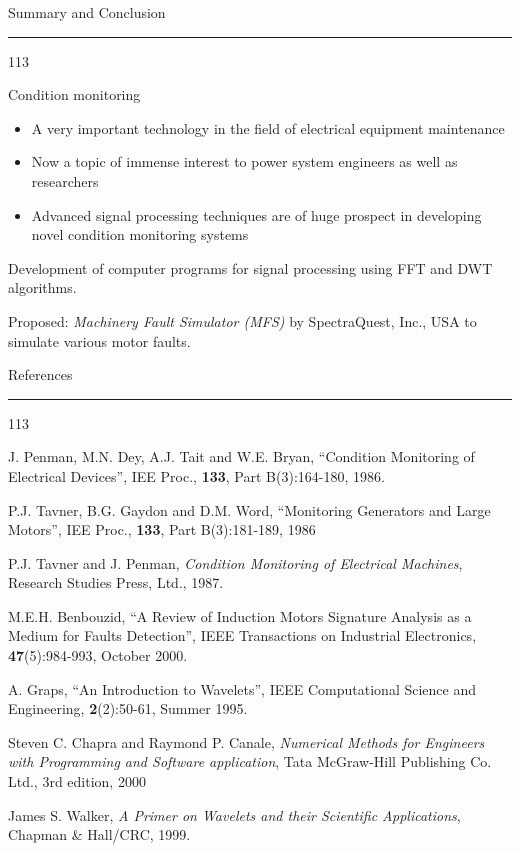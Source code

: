 \documentclass[10pt]{beamer}
\begin{document}
\begin{slide*}
{\large \textsf{Summary and Conclusion}}\\
\hrule
\vspace{10pt}
\begin{dinglist} {113}
\item Condition monitoring
\begin{itemize}
\item A very important technology in the field of electrical equipment maintenance
\item Now a topic of immense interest to power system engineers as well as researchers

\item Advanced signal processing techniques are of huge prospect in developing novel condition monitoring systems
\end{itemize} 

\item Development of computer programs for signal processing using FFT and DWT algorithms.

\item Proposed: \emph{Machinery Fault Simulator (MFS)} by SpectraQuest, Inc., USA to simulate various motor faults.
\end{dinglist} 
\end{slide*}

\begin{slide*}
{\large \textsf{References}}\\
\hrule
\vspace{10pt}
\begin{dinglist} {113}
    \item J. Penman, M.N. Dey, A.J. Tait and W.E. Bryan, ``Condition Monitoring of Electrical Devices'', IEE Proc., \textbf{133}, Part B(3):164-180, 1986.
    \item P.J. Tavner, B.G. Gaydon and D.M. Word, ``Monitoring Generators and Large Motors'', IEE Proc., \textbf{133}, Part B(3):181-189, 1986
    \item P.J. Tavner and J. Penman, \emph{Condition Monitoring of Electrical Machines}, Research Studies Press, Ltd., 1987.
    \item M.E.H. Benbouzid, ``A Review of Induction Motors Signature Analysis as a Medium  for  Faults  Detection'',  IEEE  Transactions on Industrial Electronics, \textbf{47}(5):984-993, October 2000.
    \item A. Graps, ``An Introduction to Wavelets'', IEEE Computational Science and Engineering, \textbf{2}(2):50-61, Summer 1995.
    \item Steven C. Chapra and Raymond P. Canale, \emph{Numerical Methods for Engineers with Programming and Software application}, Tata McGraw-Hill Publishing Co. Ltd., 3rd edition, 2000
    \item James S. Walker, \emph{A Primer on Wavelets and their Scientific Applications}, Chapman \& Hall/CRC, 1999.
\end{dinglist}
\end{slide*}
\end{document}

